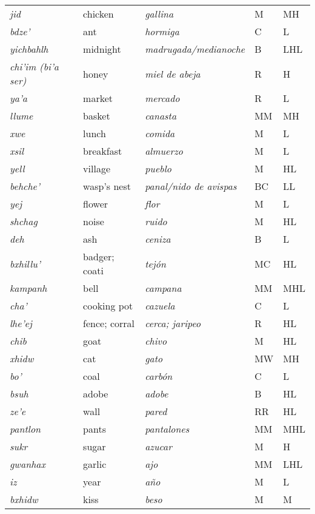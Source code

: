 \begin{longtable}{lllll}
 \textit{jid}    & chicken & \textit{gallina} & M & MH \\
 \textit{bdze'}  & ant & \textit{hormiga} & C & L \\
 \textit{yichbahlh} & midnight & \textit{madrugada/medianoche}  & B & LHL    \\
 \textit{chi'im (bi'a ser)} & honey & \textit{miel de abeja} & R & H \\
 \textit{ya'a}   & market & \textit{mercado} & R & L \\
 \textit{llume}  & basket & \textit{canasta} & MM & MH \\
 \textit{xwe}    & lunch & \textit{comida} & M & L \\
 \textit{xsil}   & breakfast & \textit{almuerzo} & M & L \\
 \textit{yell}   & village & \textit{pueblo} & M & HL \\
 \textit{behche'} & wasp's nest & \textit{panal/nido de avispas} & BC & LL \\
 \textit{yej}    & flower & \textit{flor} & M & L \\
 \textit{shchag} & noise & \textit{ruido} & M & HL \\
 \textit{deh}    & ash & \textit{ceniza} & B & L \\
 \textit{bxhillu'} & badger; coati & \textit{tejón} & MC & HL \\
 \textit{kampanh} & bell & \textit{campana} & MM & MHL    \\
 \textit{cha'}   & cooking pot & \textit{cazuela} & C & L \\
 \textit{lhe'ej} & fence; corral & \textit{cerca; jaripeo} & R & HL \\
 \textit{chib}   & goat & \textit{chivo} & M & HL \\
 \textit{xhidw}  & cat & \textit{gato} & MW & MH \\
 \textit{bo'}    & coal & \textit{carbón} & C & L \\
 \textit{bsuh}   & adobe & \textit{adobe} & B & HL \\
 \textit{ze'e}   & wall & \textit{pared} & RR & HL \\
 \textit{pantlon} & pants & \textit{pantalones} & MM & MHL \\
 \textit{sukr}   & sugar & \textit{azucar} & M & H \\
 \textit{gwanhax} & garlic & \textit{ajo} & MM & LHL \\
 \textit{iz}     & year & \textit{año} & M & L \\
 \textit{bxhidw} & kiss & \textit{beso} & M & M \\

\end{longtable}
